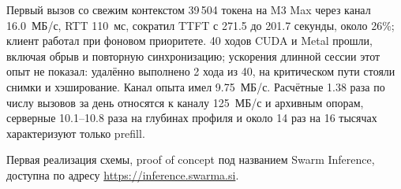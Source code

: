 Первый вызов со свежим контекстом 39\,504 токена на M3 Max через канал 16.0~МБ/с, RTT 110~мс,
сократил TTFT с 271.5 до 201.7 секунды, около 26\%; клиент работал при фоновом приоритете.
40 ходов CUDA и Metal прошли, включая обрыв и повторную синхронизацию;
ускорения длинной сессии этот опыт не показал: удалённо выполнено 2 хода из 40,
на критическом пути стояли снимки и хэширование. Канал опыта имел 9.75~МБ/с.
Расчётные 1.38 раза по числу вызовов за день относятся к каналу 125~МБ/с и архивным опорам,
серверные 10.1--10.8 раза на глубинах профиля и около 14 раз на 16 тысячах характеризуют только prefill.


Первая реализация схемы, proof of concept под названием Swarm Inference, доступна по адресу
\url{https://inference.swarma.si}.
